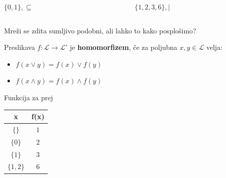 \documentclass{beamer}
\begin{document}
\begin{frame}
\begin{columns}
\begin{column}{5cm}
\begin{center}
$\{0,1\}, \subseteq$
\end{center}
\begin{figure}
\centering
{}
\end{figure}
\end{column}

\begin{column}{5cm}
\begin{center}
$\{1,2,3,6\}, |$
\end{center}
\begin{figure}
\centering
{}
\end{figure}
\end{column}
\end{columns}

\begin{block}{}
Mreži se zdita sumljivo podobni, ali lahko to kako posplošimo?
\end{block}

\end{frame}

\begin{frame}
\begin{definition}
Preslikava $f :\mathcal{L} \to \mathcal{L}'$ je \textbf{homomorfizem}, če za poljubna $x,y \in \mathcal{L}$ velja:
\begin{itemize}
\item $f(x \lor y) = f(x) \lor f(y)$
\item $f(x \land y) = f(x) \land f(y)$
\end{itemize}
\end{definition}



\begin{block}{Funkcija za prej}
\begin{table}[]
\centering
\label{my-label}
\begin{tabular}{c|c}
x         & f(x) \\ \hline
$\{\}$    & $1$  \\
$\{0\}$   & $2$  \\
$\{1\}$   & $3$  \\
$\{1,2\}$ & $6$ 
\end{tabular}
\end{table}
\end{block}

\end{frame}
\end{document}
